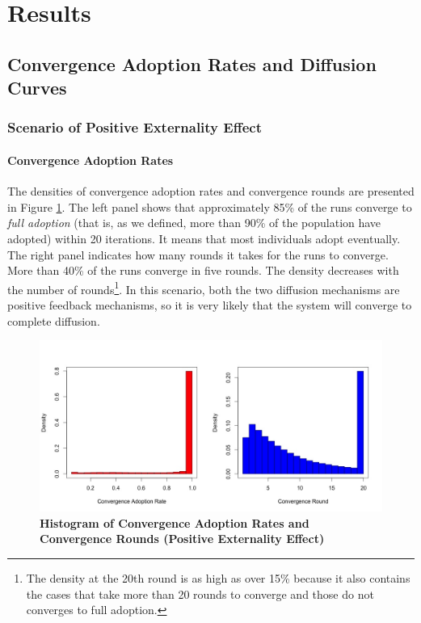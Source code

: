 \documentclass{bmcart}
\renewcommand{\figurename}{Figure }
\begin{document}
\section*{Results}
\subsection*{Convergence Adoption Rates and Diffusion Curves}
\subsubsection*{Scenario of Positive Externality Effect}
\paragraph{Convergence Adoption Rates} 
The densities of convergence adoption rates and convergence rounds are presented in \figurename \ref{Fig: hist conv adp and round pos}. The left panel shows that approximately 85\% of the runs converge to \emph{full adoption} (that is, as we defined, more than 90\% of the population have adopted) within 20 iterations. It means that most individuals adopt eventually. The right panel indicates how many rounds it takes for the runs to converge. More than 40\% of the runs converge in five rounds. The density decreases with the number of rounds\footnote{The density at the 20th round is as high as over 15\% because it also contains the cases that take more than 20 rounds to converge and those do not converges to full adoption.}. In this scenario, both the two diffusion mechanisms are positive feedback mechanisms, so it is very likely that the system will converge to complete diffusion.

\begin{center}
\begin{figure}[ht!]
\centering
\includegraphics[scale=0.35]{Hist_conv_adp_and_round_pos.jpg}
\caption{\textbf{Histogram of Convergence Adoption Rates and Convergence Rounds (Positive Externality Effect)}}
\label{Fig: hist conv adp and round pos}
\end{figure}
\end{center}
\end{document}

